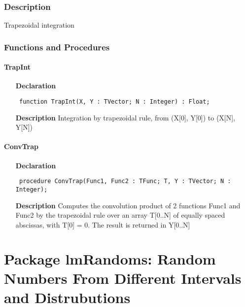 \documentclass[12pt,a4paper,oneside]{report}
\newcommand{\declarationitem}[1]{\textbf{#1}}
\newcommand{\descriptiontitle}[1]{\textbf{#1}}
\newcommand{\code}[1]{\texttt{#1}}
\begin{document}
\subsection{Description}
Trapezoidal integration 
\subsection{Functions and Procedures}
\subsubsection{TrapInt}
\label{utrapint-TrapInt}
\begin{itemize}\item[\declarationitem{Declaration}\hfill]
	\begin{flushleft}
		\code{
			function TrapInt(X, Y : TVector; N : Integer) : Float;}
		
	\end{flushleft}
	
	\par
	\item[\descriptiontitle{Description}]
	Integration by trapezoidal rule, from (X[0], Y[0]) to (X[N], Y[N])
	
\end{itemize}
\subsubsection{ConvTrap}
\label{utrapint-ConvTrap}
\begin{itemize}\item[\declarationitem{Declaration}\hfill]
	\begin{flushleft}
		\code{
			procedure ConvTrap(Func1, Func2 : TFunc; T, Y : TVector; N : Integer);}
		
	\end{flushleft}
	
	\par
	\item[\descriptiontitle{Description}]
	Computes the convolution product of 2 functions Func1 and Func2 by the trapezoidal rule over an array T[0..N] of equally spaced abscissas, with T[0] = 0. The result is returned in Y[0..N]
	
\end{itemize}
\chapter[Package lmRandoms]{Package lmRandoms: Random Numbers From Different Intervals and Distrubutions}\label{package-lmRandoms}
\end{document}
